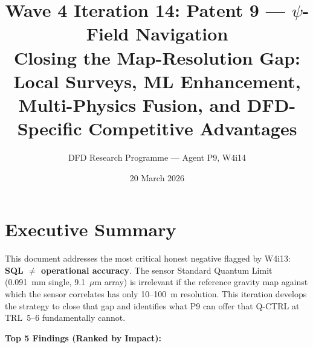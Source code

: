 \documentclass[11pt]{article}
\title{\textbf{Wave 4 Iteration 14: Patent 9 --- $\psi$-Field Navigation}\\[6pt]
Closing the Map-Resolution Gap: Local Surveys, ML Enhancement,\\
Multi-Physics Fusion, and DFD-Specific Competitive Advantages}
\author{DFD Research Programme --- Agent P9, W4i14}
\date{20 March 2026}
\theoremstyle{definition}
\theoremstyle{remark}
\begin{document}
\maketitle
\tableofcontents
\newpage

\section*{Executive Summary}

This document addresses the most critical honest negative flagged by W4i13:
\textbf{SQL $\neq$ operational accuracy}. The sensor Standard Quantum Limit
(0.091~mm single, 9.1~$\mu$m array) is irrelevant if the reference gravity
map against which the sensor correlates has only 10--100~m resolution. This
iteration develops the strategy to close that gap and identifies what P9
can offer that Q-CTRL at TRL~5--6 fundamentally cannot.

\textbf{Top 5 Findings (Ranked by Impact):}
\end{document}
